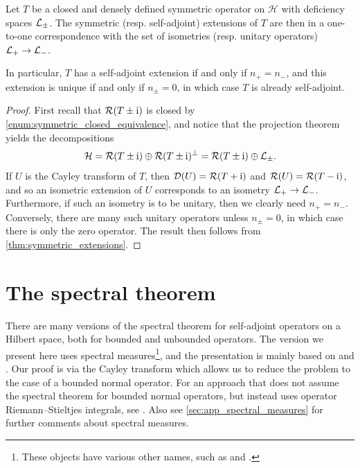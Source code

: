 \documentclass[article, a4paper, 11pt, oneside]{memoir}
\makeatletter
\numberwithin{equation}{chapter}
\newcommand{\calH}{\mathcal{H}}
\newcommand{\dom}{\mathcal{D}}
\newcommand{\range}{\mathcal{R}}
\theoremstyle{myexample}
\theoremstyle{myexample}
\theoremstyle{myexamplebreak}
\theoremstyle{myexamplebreak}
\theoremstyle{nonumberplain}
\newtheorem{proof}{\protect\@proof}
\theoremstyle{MyNonumberplain}
\newcommand{\@proof}{}
\renewcommand{\@proof}{Proof}%
\renewcommand{\@proof}{Bevis}%
\makeatother
\begin{document}
\begin{theorem}
    Let $T$ be a closed and densely defined symmetric operator on $\calH$ with deficiency spaces $\mathcal{L}_\pm$. The symmetric (resp. self-adjoint) extensions of $T$ are then in a one-to-one correspondence with the set of isometries (resp. unitary operators) $\mathcal{L}_+ \to \mathcal{L}_-$.
    
    In particular, $T$ has a self-adjoint extension if and only if $n_+ = n_-$, and this extension is unique if and only if $n_\pm = 0$, in which case $T$ is already self-adjoint.
\end{theorem}

\begin{proof}
    First recall that $\range(T \pm \iu)$ is closed by \cref{enum:symmetric_closed_equivalence}, and notice that the projection theorem yields the decompositions
    \begin{equation*}
        \calH
            = \range(T \pm \iu) \oplus \range(T \pm \iu)^\perp
            = \range(T \pm \iu) \oplus \calL_\pm.
    \end{equation*}
    If $U$ is the Cayley transform of $T$, then $\dom(U) = \range(T + \iu)$ and $\range(U) = \range(T - \iu)$, and so an isometric extension of $U$ corresponds to an isometry $\mathcal{L}_+ \to \mathcal{L}_-$. Furthermore, if such an isometry is to be unitary, then we clearly need $n_+ = n_-$. Conversely, there are many such unitary operators unless $n_\pm = 0$, in which case there is only the zero operator. The result then follows from \cref{thm:symmetric_extensions}.
\end{proof}



\chapter{The spectral theorem}

There are many versions of the spectral theorem for self-adjoint operators on a Hilbert space, both for bounded and unbounded operators. The version we present here uses spectral measures\footnote{These objects have various other names, such as  and .}, and the presentation is mainly based on \textcite[Chapter~X]{rudinfunctional} and \textcite[Section~4]{skibsted2003}. Our proof is via the Cayley transform which allows us to reduce the problem to the case of a bounded normal operator. For an approach that does not assume the spectral theorem for bounded normal operators, but instead uses operator Riemann--Stieltjes integrals, see \textcite[Chapter~4]{schmudgen2012}. Also see \cref{sec:app_spectral_measures} for further comments about spectral measures.
\end{document}
